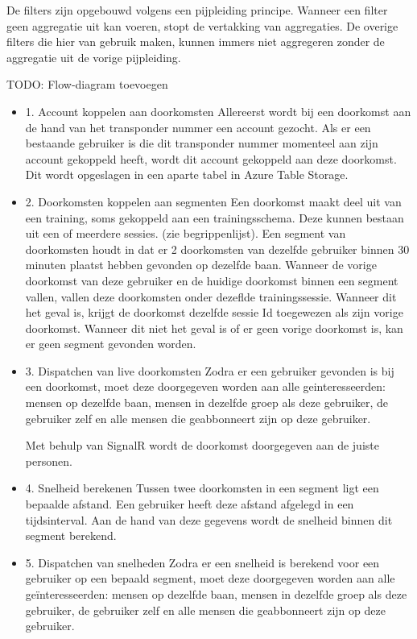 De filters zijn opgebouwd volgens een pijpleiding principe. Wanneer een filter geen aggregatie uit kan voeren, stopt de vertakking van aggregaties. De overige filters die hier van gebruik maken, kunnen immers niet aggregeren zonder de aggregatie uit de vorige pijpleiding.

{\par \bigskip \par \color{red} TODO: Flow-diagram toevoegen \par \bigskip \par }

\begin{itemize}
\item 1. Account koppelen aan doorkomsten
Allereerst wordt bij een doorkomst aan de hand van het transponder nummer een account gezocht. Als er een bestaande gebruiker is die dit transponder nummer momenteel aan zijn account gekoppeld heeft, wordt dit account gekoppeld aan deze doorkomst. Dit wordt opgeslagen in een aparte tabel in Azure Table Storage.
\item 2. Doorkomsten koppelen aan segmenten
Een doorkomst maakt deel uit van een training, soms gekoppeld aan een trainingsschema. Deze kunnen bestaan uit een of meerdere sessies. (zie begrippenlijst). Een segment van doorkomsten houdt in dat er 2 doorkomsten van dezelfde gebruiker binnen 30 minuten plaatst hebben gevonden op dezelfde baan. Wanneer de vorige doorkomst van deze gebruiker en de huidige doorkomst binnen een segment vallen, vallen deze doorkomsten onder dezeflde trainingssessie. Wanneer dit het geval is, krijgt de doorkomst dezelfde sessie Id toegewezen als zijn vorige doorkomst. Wanneer dit niet het geval is of er geen vorige doorkomst is, kan er geen segment gevonden worden.
\item 3. Dispatchen van live doorkomsten
Zodra er een gebruiker gevonden is bij een doorkomst, moet deze doorgegeven worden aan alle geinteresseerden: mensen op dezelfde baan, mensen in dezelfde groep als deze gebruiker, de gebruiker zelf en alle mensen die geabbonneert zijn op deze gebruiker.

Met behulp van SignalR wordt de doorkomst doorgegeven aan de juiste personen.

\item 4. Snelheid berekenen
Tussen twee doorkomsten in een segment ligt een bepaalde afstand. Een gebruiker heeft deze afstand afgelegd in een tijdsinterval. Aan de hand van deze gegevens wordt de snelheid binnen dit segment berekend.

\item 5. Dispatchen van snelheden
Zodra er een snelheid is berekend voor een gebruiker op een bepaald segment, moet deze doorgegeven worden aan alle geïnteresseerden: mensen op dezelfde baan, mensen in dezelfde groep als deze gebruiker, de gebruiker zelf en alle mensen die geabbonneert zijn op deze gebruiker.


\end{itemize}
